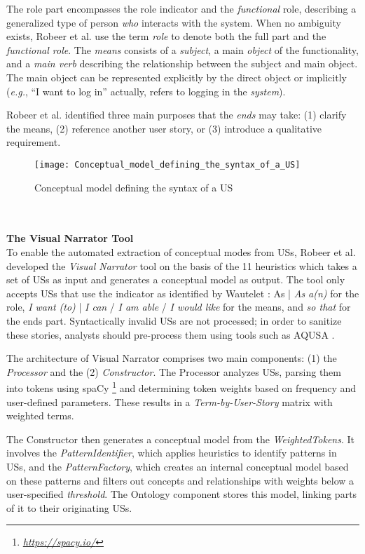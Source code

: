 The role part encompasses the role indicator and the \emph{functional} role, describing a generalized type of person \emph{who} interacts with the system. When no ambiguity exists, Robeer et al. use the term \emph{role} to denote both the full part and the \emph{functional role}. The \emph{means} consists of a \emph{subject}, a main \emph{object} of the functionality, and a \emph{main verb} describing the relationship between the subject and main object. The main object can be represented explicitly by the direct object or implicitly (\emph{e.g.}, \enquote{I want to log in} actually, refers to logging in the \emph{system}).

Robeer et al. identified three main purposes that the \emph{ends} may take: (1) clarify the means, (2) reference another user story, or (3) introduce a qualitative requirement.
\begin{figure}
\center
\texttt{[image: Conceptual\_model\_defining\_the\_syntax\_of\_a\_US]}
\caption{Conceptual model defining the syntax of a US  \cite{Robeer2016}}\label{fig:cmd}
\end{figure} \\  \\ 
\textbf{The Visual Narrator Tool}\\
To enable the automated extraction of conceptual modes from USs, Robeer et al. developed the \emph{Visual Narrator} tool on the basis of the 11 heuristics \cite{Robeer2016} which takes a set of USs as input and generates a conceptual model as output. The tool only accepts USs that use the indicator as identified by Wautelet \cite{Wautelet2014}: As | \emph{As a(n)} for the role, \emph{I want (to)} | \emph{I can} / \emph{I am able} / \emph{I would like} for the means, and \emph{so that} for the ends part. Syntactically invalid USs are not processed; in order to sanitize these stories, analysts should pre-process them using tools such as AQUSA \cite{lucassen2016improving}.

The architecture of Visual Narrator comprises two main components: (1) the \emph{Processor} and the (2) \emph{Constructor}. The Processor analyzes USs, parsing them into tokens using spaCy \footnote{\href{https://spacy.io/}{\emph{https://spacy.io/}}} and determining token weights based on frequency and user-defined parameters. These results in a \emph{Term-by-User-Story} matrix with weighted terms.

The Constructor then generates a conceptual model from the \emph{WeightedTokens}. It involves the \emph{PatternIdentifier}, which applies heuristics to identify patterns in USs, and the \emph{PatternFactory}, which creates an internal conceptual model based on these patterns and filters out concepts and relationships with weights below a user-specified \emph{threshold}. The Ontology component stores this model, linking parts of it to their originating USs.

